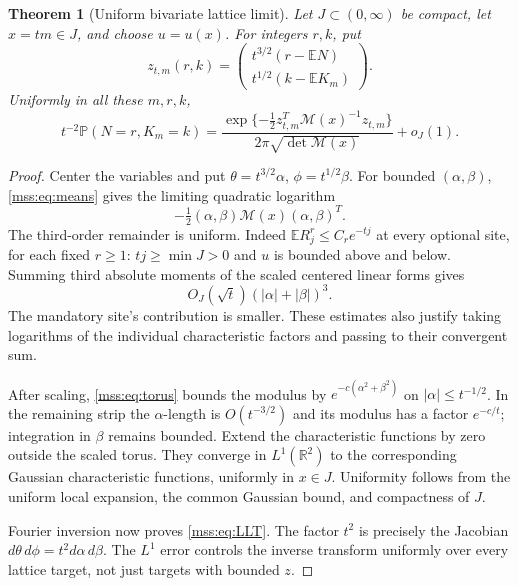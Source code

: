 \documentclass[11pt,letterpaper]{article}
\numberwithin{equation}{section}
\newtheorem{theorem}{Theorem}[section]
\theoremstyle{definition}\newtheorem{definition}[theorem]{Definition}
\theoremstyle{remark}\newtheorem{remark}[theorem]{Remark}
\newcommand{\E}{\mathbb E}
\newcommand{\Prob}{\mathbb P}
\newcommand{\R}{\mathbb R}
\begin{document}
\begin{theorem}[Uniform bivariate lattice limit]\label{mss:thm:LLT}
Let $J\subset(0,\infty)$ be compact, let $x=tm\in J$, and choose $u=u(x)$. For integers $r,k$, put
\begin{equation}\label{mss:eq:z}
z_{t,m}(r,k)=
\begin{pmatrix}t^{3/2}(r-\E N)\\t^{1/2}(k-\E K_m)\end{pmatrix}.
\end{equation}
Uniformly in all these $m,r,k$,
\begin{equation}\label{mss:eq:LLT}
t^{-2}\Prob(N=r,K_m=k)
=\frac{\exp\{-\tfrac12z_{t,m}^{T}\mathcal M(x)^{-1}z_{t,m}\}}
{2\pi\sqrt{\det\mathcal M(x)}}+o_J(1).
\end{equation}
\end{theorem}
\begin{proof}
Center the variables and put $\theta=t^{3/2}\alpha$, $\phi=t^{1/2}\beta$. For bounded $(\alpha,\beta)$, \eqref{mss:eq:means} gives the limiting quadratic logarithm
\[
-\tfrac12(\alpha,\beta)\mathcal M(x)(\alpha,\beta)^T.
\]
The third-order remainder is uniform. Indeed $\E R_j^r\le C_r e^{-tj}$ at every optional site, for each fixed $r\ge1$: $tj\ge\min J>0$ and $u$ is bounded above and below. Summing third absolute moments of the scaled centered linear forms gives
\[
O_J(\sqrt t)(|\alpha|+|\beta|)^3.
\]
The mandatory site's contribution is smaller. These estimates also justify taking logarithms of the individual characteristic factors and passing to their convergent sum.

After scaling, \eqref{mss:eq:torus} bounds the modulus by $e^{-c(\alpha^2+\beta^2)}$ on $|\alpha|\le t^{-1/2}$. In the remaining strip the $\alpha$-length is $O(t^{-3/2})$ and its modulus has a factor $e^{-c/t}$; integration in $\beta$ remains bounded. Extend the characteristic functions by zero outside the scaled torus. They converge in $L^1(\R^2)$ to the corresponding Gaussian characteristic functions, uniformly in $x\in J$. Uniformity follows from the uniform local expansion, the common Gaussian bound, and compactness of $J$.

Fourier inversion now proves \eqref{mss:eq:LLT}. The factor $t^2$ is precisely the Jacobian $d\theta\,d\phi=t^2d\alpha\,d\beta$. The $L^1$ error controls the inverse transform uniformly over every lattice target, not just targets with bounded $z$.
\end{proof}
\end{document}
